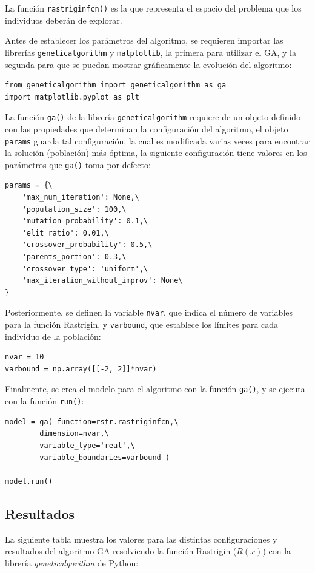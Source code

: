 \documentclass[a4paper, 12pt]{article}
\begin{document}
La función \lstinline{rastriginfcn()} es la que representa el espacio del problema que los individuos deberán de explorar.

Antes de establecer los parámetros del algoritmo, se requieren importar las librerías \lstinline{geneticalgorithm} y \lstinline{matplotlib}, la primera para utilizar el GA, y la segunda para que se puedan mostrar gráficamente la evolución del algoritmo:

\begin{lstlisting}
from geneticalgorithm import geneticalgorithm as ga
import matplotlib.pyplot as plt
\end{lstlisting}

La función \lstinline{ga()} de la librería \lstinline{geneticalgorithm} requiere de un objeto definido con las propiedades que determinan la configuración del algoritmo, el objeto \lstinline{params} guarda tal configuración, la cual es modificada varias veces para encontrar la solución (población) más óptima, la siguiente configuración tiene valores en los parámetros que \lstinline{ga()} toma por defecto:

\begin{lstlisting}
params = {\
    'max_num_iteration': None,\
    'population_size': 100,\
    'mutation_probability': 0.1,\
    'elit_ratio': 0.01,\
    'crossover_probability': 0.5,\
    'parents_portion': 0.3,\
    'crossover_type': 'uniform',\
    'max_iteration_without_improv': None\
}
\end{lstlisting}

Posteriormente, se definen la variable \lstinline{nvar}, que indica el número de variables para la función Rastrigin, y \lstinline{varbound}, que establece los límites para cada individuo de la población:

\begin{lstlisting}
nvar = 10
varbound = np.array([[-2, 2]]*nvar)
\end{lstlisting}

Finalmente, se crea el modelo para el algoritmo con la función \lstinline{ga()}, y se ejecuta con la función \lstinline{run()}:

\begin{lstlisting}
model = ga( function=rstr.rastriginfcn,\
        dimension=nvar,\
        variable_type='real',\
        variable_boundaries=varbound )

model.run()
\end{lstlisting}

\subsection{Resultados}
La siguiente tabla muestra los valores para las distintas configuraciones y resultados del algoritmo GA resolviendo la función Rastrigin ($R(x)$) con la librería \emph{geneticalgorithm} de Python:
\end{document}
